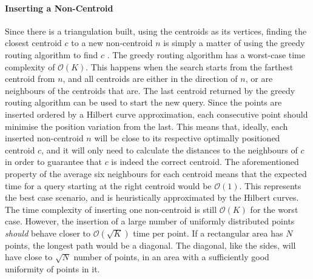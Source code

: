 \paragraph{Inserting a Non-Centroid}
Since there is a triangulation built, using the centroids as its vertices, finding the closest centroid $c$ to a new non-centroid $n$ is simply a matter of using the greedy routing algorithm to find $c$ \cite{greedyroute}.
The greedy routing algorithm has a worst-case time complexity of $\mathcal{O}(K)$. This happens when the search starts from the farthest centroid from $n$, and all centroids are either in the direction of $n$, or are neighbours of the centroids that are. 
The last centroid returned by the greedy routing algorithm can be used to start the new query. Since the points are inserted ordered by a Hilbert curve approximation, each consecutive point should minimise the position variation from the last.
This means that, ideally, each inserted non-centroid $n$ will be close to its respective optimally positioned centroid $c$, and it will only need to calculate the distances to the neighbours of $c$ in order to guarantee that $c$ is indeed the correct centroid.
The aforementioned property of the average six neighbours for each centroid means that the expected time for a query starting at the right centroid would be $\mathcal{O}(1)$. This represents the best case scenario, and is heuristically approximated by the Hilbert curves. The time complexity of inserting one non-centroid is still $\mathcal{O}(K)$ for the worst case. 
However, the insertion of a large number of uniformly distributed points \emph{should} behave closer to $\mathcal{O}(\sqrt{K})$ time per point. If a rectangular area has $N$ points, the longest path would be a diagonal. The diagonal, like the sides, will have close to $\sqrt{N}$ number of points, in an area with a sufficiently good uniformity of points in it.

